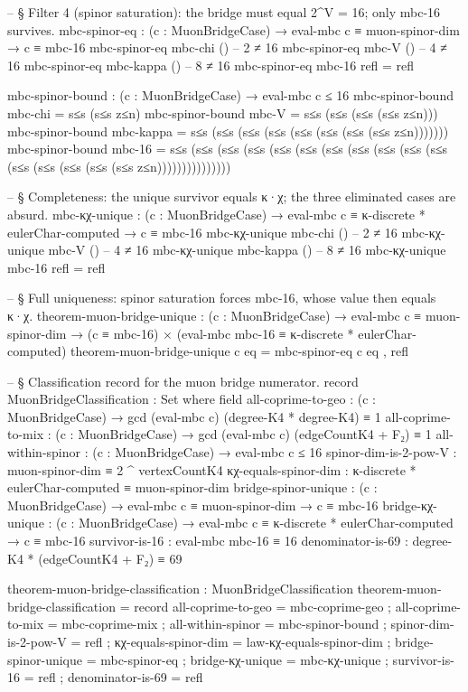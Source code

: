 \documentclass[11pt,a4paper]{book}
\begin{document}
\begin{code}
-- § Filter 4 (spinor saturation): the bridge must equal 2^V = 16; only mbc-16 survives.
mbc-spinor-eq :
  (c : MuonBridgeCase) →
  eval-mbc c ≡ muon-spinor-dim →
  c ≡ mbc-16
mbc-spinor-eq mbc-chi   ()   -- 2 ≠ 16
mbc-spinor-eq mbc-V     ()   -- 4 ≠ 16
mbc-spinor-eq mbc-kappa ()   -- 8 ≠ 16
mbc-spinor-eq mbc-16    refl = refl

mbc-spinor-bound : (c : MuonBridgeCase) → eval-mbc c ≤ 16
mbc-spinor-bound mbc-chi   = s≤s (s≤s z≤n)
mbc-spinor-bound mbc-V     = s≤s (s≤s (s≤s (s≤s z≤n)))
mbc-spinor-bound mbc-kappa = s≤s (s≤s (s≤s (s≤s (s≤s (s≤s (s≤s (s≤s z≤n)))))))
mbc-spinor-bound mbc-16    = s≤s (s≤s (s≤s (s≤s (s≤s (s≤s (s≤s (s≤s (s≤s (s≤s (s≤s (s≤s (s≤s (s≤s (s≤s (s≤s z≤n)))))))))))))))

-- § Completeness: the unique survivor equals κ·χ; the three eliminated cases are absurd.
mbc-κχ-unique :
  (c : MuonBridgeCase) →
  eval-mbc c ≡ κ-discrete * eulerChar-computed →
  c ≡ mbc-16
mbc-κχ-unique mbc-chi   ()   -- 2 ≠ 16
mbc-κχ-unique mbc-V     ()   -- 4 ≠ 16
mbc-κχ-unique mbc-kappa ()   -- 8 ≠ 16
mbc-κχ-unique mbc-16    refl = refl

-- § Full uniqueness: spinor saturation forces mbc-16, whose value then equals κ·χ.
theorem-muon-bridge-unique :
  (c : MuonBridgeCase) →
  eval-mbc c ≡ muon-spinor-dim →
  (c ≡ mbc-16) × (eval-mbc mbc-16 ≡ κ-discrete * eulerChar-computed)
theorem-muon-bridge-unique c eq = mbc-spinor-eq c eq , refl

-- § Classification record for the muon bridge numerator.
record MuonBridgeClassification : Set where
  field
    all-coprime-to-geo    : (c : MuonBridgeCase) → gcd (eval-mbc c) (degree-K4 * degree-K4) ≡ 1
    all-coprime-to-mix    : (c : MuonBridgeCase) → gcd (eval-mbc c) (edgeCountK4 + F₂) ≡ 1
    all-within-spinor     : (c : MuonBridgeCase) → eval-mbc c ≤ 16
    spinor-dim-is-2-pow-V : muon-spinor-dim ≡ 2 ^ vertexCountK4
    κχ-equals-spinor-dim  : κ-discrete * eulerChar-computed ≡ muon-spinor-dim
    bridge-spinor-unique  : (c : MuonBridgeCase) → eval-mbc c ≡ muon-spinor-dim → c ≡ mbc-16
    bridge-κχ-unique      : (c : MuonBridgeCase) → eval-mbc c ≡ κ-discrete * eulerChar-computed → c ≡ mbc-16
    survivor-is-16        : eval-mbc mbc-16 ≡ 16
    denominator-is-69     : degree-K4 * (edgeCountK4 + F₂) ≡ 69

theorem-muon-bridge-classification : MuonBridgeClassification
theorem-muon-bridge-classification = record
  { all-coprime-to-geo    = mbc-coprime-geo
  ; all-coprime-to-mix    = mbc-coprime-mix
  ; all-within-spinor     = mbc-spinor-bound
  ; spinor-dim-is-2-pow-V = refl
  ; κχ-equals-spinor-dim  = law-κχ-equals-spinor-dim
  ; bridge-spinor-unique  = mbc-spinor-eq
  ; bridge-κχ-unique      = mbc-κχ-unique
  ; survivor-is-16        = refl
  ; denominator-is-69     = refl
  }


\end{code}
\end{document}
